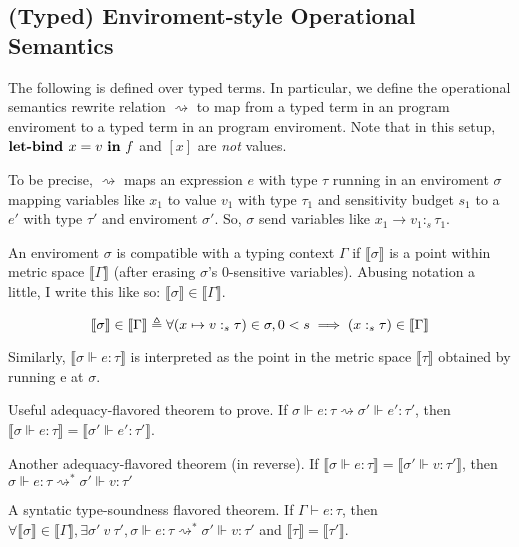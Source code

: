 \subsection{(Typed) Enviroment-style Operational Semantics}
The following is defined over typed terms. In particular, we define the
operational semantics rewrite relation $\rightsquigarrow$ to map from a typed
term in an program enviroment to a typed term in an program enviroment. Note
that in this setup, $\textbf{let-bind } x = v \ \textbf{in} \ f$ and $[x]$ are \textit{not}
values.

To be precise, $\rightsquigarrow$ maps an expression $e$ with type $\tau$
running in an enviroment $\sigma$ mapping variables like $x_1$ to value $v_1$
with type $\tau_1$ and sensitivity budget $s_1$ to a $e'$ with type $\tau'$ and
enviroment $\sigma'$.
So, $\sigma$ send variables like $x_1 \to v_1 :_s \tau_1$.

An enviroment $\sigma$ is compatible with a typing context $\Gamma$ if
$\llbracket \sigma \rrbracket$ is a point within metric space $\llbracket \Gamma
\rrbracket$ (after erasing $\sigma$'s $0$-sensitive variables). Abusing notation
a little, I write this like so: $\llbracket \sigma \rrbracket \in \llbracket
\Gamma \rrbracket$.

\begin{equation*}
  \llbracket \sigma \rrbracket \in \llbracket \Gamma \rrbracket 
  \triangleq \forall
  \\ 
  (x \mapsto v :_s \tau) \in \sigma, 0 < s \implies (x :_s \tau) \in \llbracket
  \Gamma \rrbracket
\end{equation*}

Similarly, $\llbracket \sigma \Vdash e : \tau \rrbracket$ is
interpreted as the point in the metric space $\llbracket \tau \rrbracket$
obtained by running e at $\sigma$.

Useful adequacy-flavored theorem to prove. If $\sigma \Vdash e : \tau \rightsquigarrow \sigma'
\Vdash e' : \tau'$, then $\llbracket \sigma \Vdash e : \tau \rrbracket =
\llbracket \sigma' \Vdash e' : \tau' \rrbracket$.

Another adequacy-flavored theorem (in reverse). If $\llbracket \sigma \Vdash e :
\tau \rrbracket = \llbracket \sigma' \Vdash v : \tau' \rrbracket$, then $\sigma
\Vdash e : \tau \rightsquigarrow^{*} \sigma' \Vdash v : \tau'$

A syntatic type-soundness flavored theorem. If $\Gamma \vdash e : \tau$, then
$\forall \llbracket \sigma \rrbracket \in \llbracket \Gamma \rrbracket, \exists
\sigma' \ v \ \tau', \sigma \Vdash e : \tau \rightsquigarrow^{*} \sigma' \Vdash v :
\tau'$ and $\llbracket \tau \rrbracket = \llbracket \tau' \rrbracket$.

